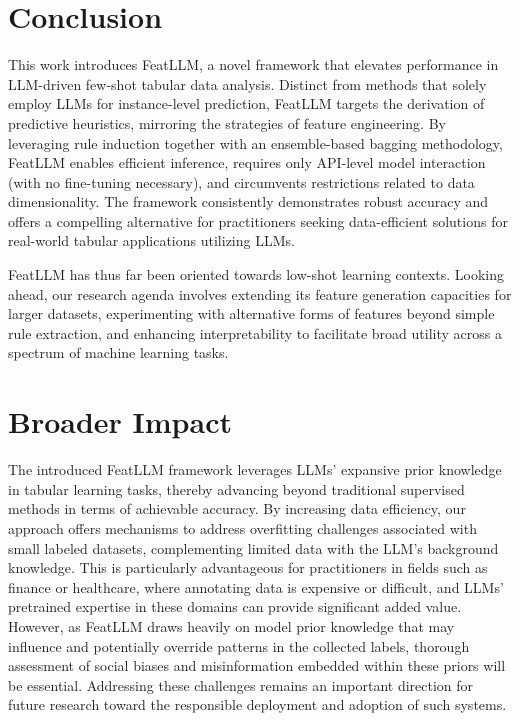 \section{Conclusion}
This work introduces \textsf{FeatLLM}, a novel framework that elevates performance in LLM-driven few-shot tabular data analysis. Distinct from methods that solely employ LLMs for instance-level prediction, \textsf{FeatLLM} targets the derivation of predictive heuristics, mirroring the strategies of feature engineering. By leveraging rule induction together with an ensemble-based bagging methodology, \textsf{FeatLLM} enables efficient inference, requires only API-level model interaction (with no fine-tuning necessary), and circumvents restrictions related to data dimensionality. The framework consistently demonstrates robust accuracy and offers a compelling alternative for practitioners seeking data-efficient solutions for real-world tabular applications utilizing LLMs.

\textsf{FeatLLM} has thus far been oriented towards low-shot learning contexts. Looking ahead, our research agenda involves extending its feature generation capacities for larger datasets, experimenting with alternative forms of features beyond simple rule extraction, and enhancing interpretability to facilitate broad utility across a spectrum of machine learning tasks.

\section{Broader Impact} The introduced \textsf{FeatLLM} framework leverages LLMs’ expansive prior knowledge in tabular learning tasks, thereby advancing beyond traditional supervised methods in terms of achievable accuracy. By increasing data efficiency, our approach offers mechanisms to address overfitting challenges associated with small labeled datasets, complementing limited data with the LLM's background knowledge. This is particularly advantageous for practitioners in fields such as finance or healthcare, where annotating data is expensive or difficult, and LLMs’ pretrained expertise in these domains can provide significant added value. However, as \textsf{FeatLLM} draws heavily on model prior knowledge that may influence and potentially override patterns in the collected labels, thorough assessment of social biases and misinformation embedded within these priors will be essential. Addressing these challenges remains an important direction for future research toward the responsible deployment and adoption of such systems.

